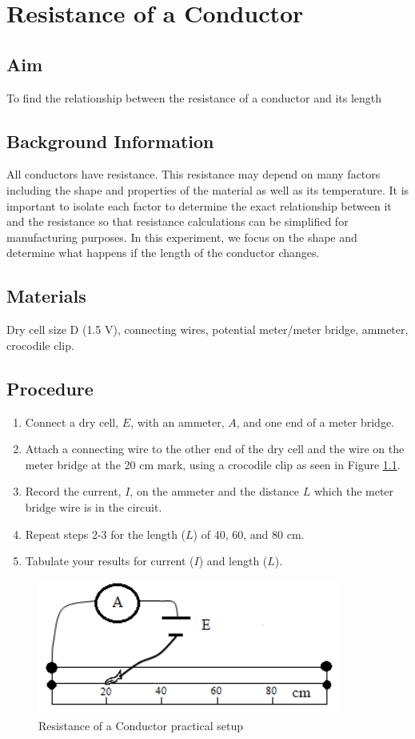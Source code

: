 \chapter{Resistance of a Conductor}

\section{Aim}
To find the relationship between the resistance of a conductor and its length

\section{Background Information}
All conductors have resistance. This resistance may depend on many factors including the shape and properties of the material as well as its temperature. It is important to isolate each factor to determine the exact relationship between it and the resistance so that resistance calculations can be simplified for manufacturing purposes. In this experiment, we focus on the shape and determine what happens if the length of the conductor changes. 

\section{Materials}
Dry cell size D (1.5 V), connecting wires, potential meter\slash meter bridge, ammeter, crocodile clip. 

\section{Procedure}
\begin{enumerate}
\item Connect a dry cell, $E$, with an ammeter, $A$, and one end of a meter bridge.
\item Attach a connecting wire to the other end of the dry cell and the wire on the meter bridge at the 20 cm mark, using a crocodile clip as seen in Figure \ref{fig:resistance-conductor-1}. 
\item Record the current, $I$, on the ammeter and the distance $L$ which the meter bridge wire is in the circuit. 
\item Repeat steps 2-3 for the length ($L$) of 40, 60, and 80 cm. 
\item Tabulate your results for current ($I$) and length ($L$).
\end{enumerate}

\begin{figure}[h!]
\centering
\includegraphics[width=10cm]{./img/resistance-conductor-1.png}
\caption{Resistance of a Conductor practical setup}
\label{fig:resistance-conductor-1}
\end{figure}

